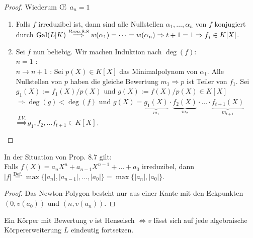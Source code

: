 \begin{proof}
Wiederum \OE \ $a_n=1$
\begin{enumerate}[(1)]
\item Falls $f$ irreduzibel ist, dann sind alle Nullstellen $\alpha_1, \dots, \alpha_n$ von $f$ konjugiert durch $\operatorname{Gal}(L|K) \stackrel{Bem. 8.8}{\Longrightarrow} w(\alpha_1)=\dots=w(\alpha_n) \Rightarrow t+1=1 \Rightarrow f_j \in K[X]$.
\item Sei $f$ nun beliebig. Wir machen Induktion nach $\deg(f)$:\\
\glqq $n=1$ \grqq: \checkmark\\
\glqq $n \to n+1$ \grqq: Sei $p(X) \in K[X]$ das Minimalpolynom von $\alpha_1$. Alle Nullstellen von $p$ haben die gleiche Bewertung $m_1 \Rightarrow p$ ist Teiler von $f_1$. Sei $g_1(X):= f_1(X)/p(X)$ und $g(X):=f(X)/p(X) \in K[X]$\\
$\Rightarrow \deg(g) < \deg(f)$ und $g(X)=\underbrace{g_1(X)}_{m_1} \cdot \underbrace{f_2(X)}_{m_2} \cdot \ldots \cdot \underbrace{f_{t+1}(X)}_{m_{t+1}}$\\
$\stackrel{I.V.}{\Rightarrow} g_1, f_2, \dots f_{t+1} \in K[X]$.
\end{enumerate}
\end{proof}

\begin{Kor}
In der Situation von Prop. 8.7 gilt:\\
Falls $f(X)=a_n X^n + a_{n-1}X^{n-1} + \dots + a_0$ irreduzibel, dann $|f| \stackrel{\text{Def.}}{=} \max\{|a_n|, |a_{n-1}|, \dots, |a_0|\}=\max\{|a_n|, |a_0|\}$.
\end{Kor}

\begin{proof}
Das Newton-Polygon besteht nur aus einer Kante mit den Eckpunkten $(0, v(a_0))$ und $(n, v(a_n))$.
\end{proof}

\begin{Prop}
Ein Körper mit Bewertung $v$ ist Henselsch $\iff v$ lässt sich auf jede algebraische Körpererweiterung $L$ eindeutig fortsetzen.
\end{Prop}
